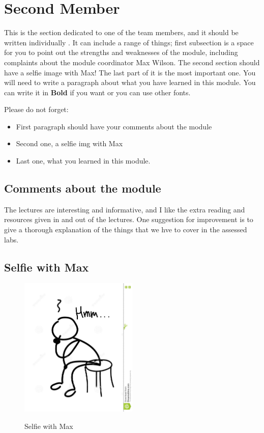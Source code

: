 \section{Second Member}
This is the section dedicated to one of the team members, and it should be written individually . It can include a range of things; first subsection is a space for you to point out the strengths and weaknesses of the module, including complaints about the module coordinator Max Wilson. The second section should have a selfie image with Max! The last part of it is the most important one. You will need to write a paragraph about what you have learned in this module. You can write it in \textbf{Bold} if you want or you can use other fonts. 

Please do not forget:
\begin{itemize}
	\item First paragraph should have your comments about the module
	\item Second one, a selfie img with Max
	\item Last one, what you learned in this module.
\end{itemize}

\subsection{Comments about the module}
The lectures are interesting and informative, and I like the extra reading and resources given in and out of the lectures. One suggestion for improvement is to give a thorough explanation of the things that we hve to cover in the assessed labs.
\subsection{Selfie with Max}


\begin{figure}[h]
\caption{Selfie with Max}
\centering
\includegraphics[width=0.5\textwidth]{selfie.jpg}
\label{fig:selfie}
\end{figure}

